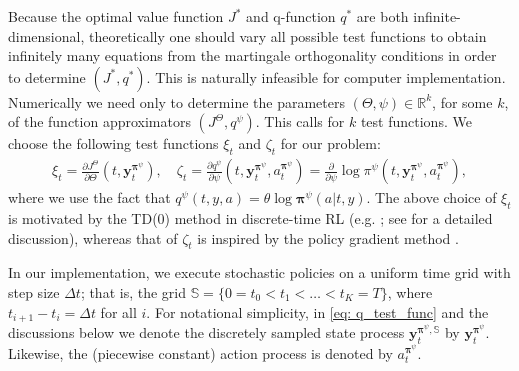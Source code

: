 \documentclass[11pt]{article}
\newcommand{\bm}[1]{\boldsymbol{#1}}
\newcommand{\bpi}{\boldsymbol{\pi}}
\begin{document}
Because the optimal value function $J^*$ and q-function $q^*$ are both infinite-dimensional, theoretically one should vary all possible test functions to obtain infinitely many equations from the martingale orthogonality conditions in order to determine $(J^*, q^*)$. This is naturally infeasible for computer implementation. Numerically we need only to determine the parameters $(\Theta, \psi) \in \mathbb{R}^k$, for some $k$, of  the function approximators $(J^{\Theta}, q^{\psi})$. This calls for $k$ test functions. We choose the following test functions $\xi_t$ and $\zeta_t$ for our problem:
\begin{align}\label{eq: q_test_func}
\xi_t = \frac{\partial J^{\Theta}}{\partial \Theta}(t, \mathbf{y}_t^{\bm\pi^{\psi}}),  \quad \zeta_t = \frac{\partial q^{\psi}}{\partial \psi}(t, \mathbf{y}_t^{\bm\pi^{\psi}},a_t^{\bm\pi^{\psi}}) = \frac{\partial }{\partial \psi} \log \pi^{\psi}(t, \mathbf{y}_t^{\bm\pi^{\psi}},a_t^{\bm\pi^{\psi}}),
\end{align}
where we use the fact that $q^{\psi}(t, y, a) = \theta \log \bpi^{\psi} (a| t, y)$.
The above choice of $\xi_t$ is motivated by the TD(0) method  in discrete-time RL (e.g. \citealp{bhandari2021finite}; see \citealp[Section 4.2]{JZ21} for a detailed discussion), whereas that of $\zeta_t$ is inspired by the policy gradient method \citep{schulman2015high, JZ22}.

In our implementation, we execute stochastic policies on a uniform time grid with step size $\Delta t$; that is, the grid $\mathbb{S}= \{0= t_0 < t_1 < \ldots < t_K = T\}$, where $t_{i+1} - t_i = \Delta t$ for all $i$. For notational simplicity, in \eqref{eq: q_test_func} and the discussions below  we denote the discretely sampled state process $\mathbf{y}_t^{\bm\pi^{\psi}, \mathbb{S}}$ by $\mathbf{y}_t^{\bm\pi^{\psi}}$. Likewise, the (piecewise constant) action process is denoted by $a_t^{\bm\pi^{\psi}}$.
\end{document}
